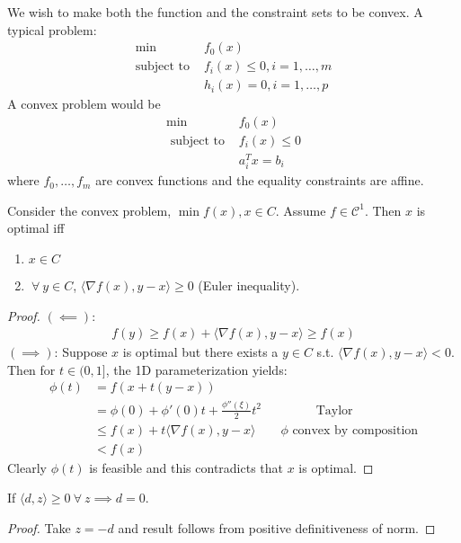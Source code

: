 \documentclass[class=article,crop=false]{standalone}
\begin{document}
We wish to make both the function and the constraint sets to be convex. 
A typical problem:
\begin{align*}
\min &f_0(x)\\
\text{subject to } &f_i(x) \leq 0, i = 1,\ldots,m\\
&h_i(x) = 0 , i = 1,\ldots,p
\end{align*}
A convex problem would be
\begin{align*}
	\min\ &f_0 (x) \\
	     \text{ subject to }  &f_i(x) \leq 0 \\
				  &a_i^{T} x =b_i
\end{align*}
where $ f_0, \ldots, f_m$ are convex functions and the equality constraints are affine.
\begin{thm}
Consider the convex problem, $\min f(x), x \in C$. Assume $ f \in \mathcal{ C}^{1}$. Then $ x$ is optimal iff
\begin{enumerate}[label=\arabic*)]
	\item $ x \in C$
	\item $ \ \forall \ y \in C$, $ \langle \nabla f(x), y-x \rangle \geq 0$ (Euler inequality).
\end{enumerate}

\end{thm}

\begin{proof}
	$ (\impliedby)$: 
	\begin{align*}
		f(y) \geq  f(x) + \langle \nabla f(x) , y-x \rangle \geq f(x)
	\end{align*}
	$ (\implies)$:
	Suppose $ x$ is optimal but there exists a $ y \in C$ s.t. $\langle \nabla f(x),y-x \rangle < 0$. Then for $ t \in (0,1]$, the 1D parameterization yields:
	\begin{align*}
		\phi(t) &=f(x+t(y-x))\\
			&= \phi(0) + \phi'( 0) t + \frac{\phi''( \xi)}{ 2} t^2 \qquad \qquad  \text{ Taylor} \\
			&\leq f(x) + t \langle \nabla f(x), y-x \rangle \qquad \phi \text{ convex by composition}  \\
			&< f(x)
	\end{align*}
	Clearly $ \phi(t)$ is feasible and this contradicts that $ x$ is optimal. 
\end{proof}
\begin{coro}
If $ \langle d,z \rangle \geq 0 \ \forall \ z \implies d=0$.
\end{coro}
\begin{proof}
Take $ z=-d$ and result follows from positive definitiveness of norm.
\end{proof}
\end{document}
